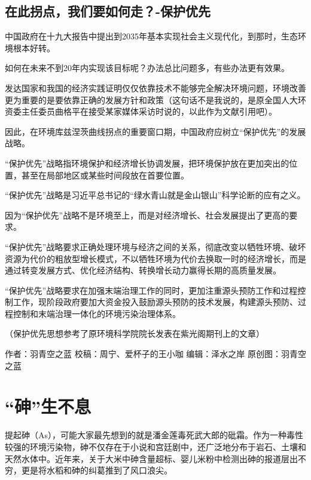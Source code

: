 \documentclass[]{book}
\begin{document}
\subsection{在此拐点，我们要如何走？-保护优先}\label{-}

中国政府在十九大报告中提出到2035年基本实现社会主义现代化，到那时，生态环境根本好转。

如何在未来不到20年内实现该目标呢？办法总比问题多，有些办法更有效果。

发达国家和我国的经济实践证明仅仅依靠技术不能够完全解决环境问题，环境改善更为重要的是要依靠正确的发展方针和政策（这句话不是我说的，是原全国人大环资委主任委员曲格平在接受某家媒体采访时说的，以此作为文献引用吧）。

因此，在环境库兹涅茨曲线拐点的重要窗口期，中国政府应树立``保护优先''的发展战略。

``保护优先''战略指环境保护和经济增长协调发展，把环境保护放在更加突出的位置，甚至在局部地区或某些时间段放在首要位置。

``保护优先''战略是习近平总书记的``绿水青山就是金山银山''科学论断的应有之义。

因为``保护优先''战略不是环境至上，而是对经济增长、社会发展提出了更高的要求。

``保护优先''战略要求正确处理环境与经济之间的关系，彻底改变以牺牲环境、破坏资源为代价的粗放型增长模式，不以牺牲环境为代价去换取一时的经济增长，而是通过转变发展方式、优化经济结构、转换增长动力赢得长期的高质量发展。

``保护优先''战略要求在加强末端治理工作的同时，更加注重源头预防工作和过程控制工作，现阶段政府要加大资金投入鼓励源头预防的技术发展，构建源头预防、过程控制和末端治理一体化的环境污染治理体系。

（保护优先思想参考了原环境科学院院长发表在紫光阁期刊上的文章）

作者：羽青空之蓝 校稿：周宁、爱杯子的王小咖 编辑：泽水之岸
原创图：羽青空之蓝

\section{\texorpdfstring{``砷''生不息}{砷生不息}}

提起砷（As），可能大家最先想到的就是潘金莲毒死武大郎的砒霜。作为一种毒性较强的环境污染物，砷不仅存在于小说和宫廷剧中，还广泛地分布于岩石、土壤和天然水体中。近年来，关于大米中砷含量超标、婴儿米粉中检测出砷的报道层出不穷，更是将水稻和砷的纠葛推到了风口浪尖。
\end{document}
